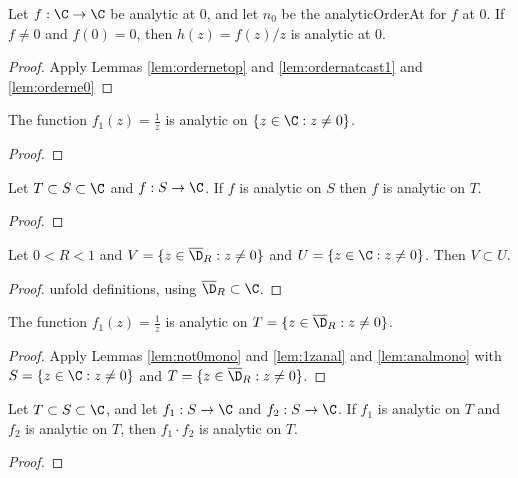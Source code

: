 \begin{lemma} \label{lem:ordernatcast2} 
\leanok
Let $f:\C\to\C$ be analytic at $0$, and let $n_0$ be the analyticOrderAt for $f$ at $0$. If $f\neq0$ and $f(0)=0$, then $h(z)=f(z)/z$ is analytic at $0$.
\end{lemma}
\begin{proof}
\leanok
{}
Apply Lemmas \ref{lem:ordernetop} and \ref{lem:ordernatcast1} and \ref{lem:orderne0}
\end{proof}




\begin{lemma} \label{lem:1zanal}
\leanok
The function $f_1(z) = \frac{1}{z}$ is analytic on $\{z\in\C: z \neq0\}$.
\end{lemma}
\begin{proof}
\leanok
\end{proof}

\begin{lemma} \label{lem:analmono} 
\leanok
Let $T\subset S\subset\C$ and $f:S\to\C$.
If $f$ is analytic on $S$ then $f$ is analytic on $T$.
\end{lemma}
\begin{proof}
\leanok
\end{proof}

\begin{lemma} \label{lem:not0mono} 
\leanok
Let $0<R<1$ and $V=\{z\in \overline{\D}_R: z \neq0\}$ and $U=\{z\in\C: z \neq0\}$. Then $V\subset U$.
\end{lemma}
\begin{proof}
\leanok
unfold definitions, using $\overline{\D}_R\subset \C$.
\end{proof}

\begin{lemma} \label{lem:1zanalDR} 
\leanok
The function $f_1(z) = \frac{1}{z}$ is analytic on $T=\{z\in \overline{\D}_R: z \neq0\}$.
\end{lemma}
\begin{proof}
\leanok
{}
Apply Lemmas \ref{lem:not0mono} and \ref{lem:1zanal} and \ref{lem:analmono} with $S=\{z\in\C: z \neq0\}$ and $T=\{z\in \overline{\D}_R: z \neq0\}$.
\end{proof}


\begin{lemma} \label{lem:analprod} 
\leanok
Let $T\subset S\subset\C$, and let $f_1:S\to \C$ and $f_2:S\to \C$.
If $f_1$ is analytic on $T$ and $f_2$ is analytic on $T$, then $f_1\cdot f_2$ is analytic on $T$.
\end{lemma}
\begin{proof}
\leanok
\end{proof}

